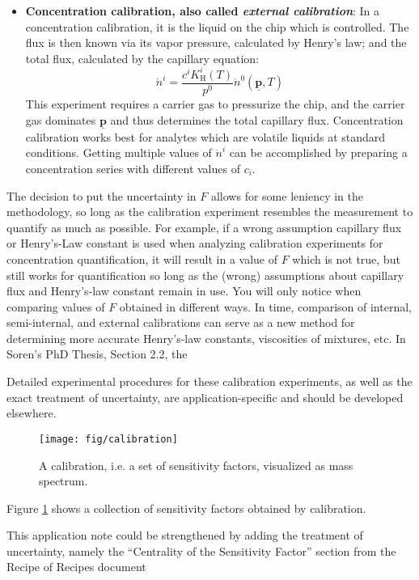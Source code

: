 \documentclass{article}
\renewcommand{\vec}[1]{\underline{\mathbf{#1}}}
\begin{document}
\begin{itemize}
	\item \textbf{Concentration calibration, also called \textit{external calibration}}: In a concentration calibration, it is the liquid on the chip which is controlled. The flux is then known via its vapor pressure, calculated by Henry's law; and the total flux, calculated by the capillary equation: 	
	\begin{equation}
	\dot{n}^i =  \frac{c^iK_\text{H}^i(T)}{p^0} \dot{n}^0(\vec{p}, T) 
	\end{equation}
	This experiment requires a carrier gas to pressurize the chip, and the carrier gas dominates $\vec{p}$ and thus determines the total capillary flux.
	Concentration calibration works best for analytes which are volatile liquids at standard conditions. Getting multiple values of $\dot{n}^i$ can be accomplished by preparing a concentration series with different values of $c_i$.
	
\end{itemize}

The decision to put the uncertainty in $F$ allows for some leniency in the methodology, so long as the calibration experiment resembles the measurement to quantify as much as possible. For example, if a wrong assumption capillary flux or Henry's-Law constant is used when analyzing calibration experiments for concentration quantification, it will result in a value of $F$ which is not true, but still works for quantification so long as the (wrong) assumptions about capillary flux and Henry's-law constant remain in use. You will only notice when comparing values of $F$ obtained in different ways. In time, comparison of internal, semi-internal, and external calibrations can serve as a new method for determining more accurate Henry's-law constants, viscosities of mixtures, etc. In Soren's PhD Thesis, Section 2.2, the 

Detailed experimental procedures for these calibration experiments, as well as the exact treatment of uncertainty, are application-specific and should be developed elsewhere.

\begin{figure}
	\centering
	\texttt{[image: fig/calibration]}
	\caption{A calibration, i.e. a set of sensitivity factors, visualized as mass spectrum.}
	\label{fig:cal}
\end{figure}

Figure \ref{fig:cal} shows a collection of sensitivity factors obtained by calibration.

{\color{red} This application note could be strengthened by adding the treatment of uncertainty, namely the ``Centrality of the Sensitivity Factor'' section from the Recipe of Recipes document}
\end{document}
